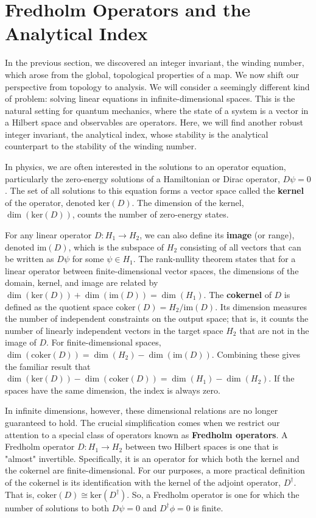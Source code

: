 \section{Fredholm Operators and the Analytical Index}
\label{sec:fredholm_index}

In the previous section, we discovered an integer invariant, the winding number, which arose from the global, topological properties of a map.
We now shift our perspective from topology to analysis.
We will consider a seemingly different kind of problem: solving linear equations in infinite-dimensional spaces.
This is the natural setting for quantum mechanics, where the state of a system is a vector in a Hilbert space and observables are operators.
Here, we will find another robust integer invariant, the analytical index, whose stability is the analytical counterpart to the stability of the winding number.

In physics, we are often interested in the solutions to an operator equation, particularly the zero-energy solutions of a Hamiltonian or Dirac operator, $D\psi = 0$.
The set of all solutions to this equation forms a vector space called the \textbf{kernel} of the operator, denoted $\text{ker}(D)$.
The dimension of the kernel, $\dim(\text{ker}(D))$, counts the number of zero-energy states.

For any linear operator $D: H_1 \to H_2$, we can also define its \textbf{image} (or range), denoted $\text{im}(D)$, which is the subspace of $H_2$ consisting of all vectors that can be written as $D\psi$ for some $\psi \in H_1$.
The rank-nullity theorem states that for a linear operator between finite-dimensional vector spaces, the dimensions of the domain, kernel, and image are related by $\dim(\text{ker}(D)) + \dim(\text{im}(D)) = \dim(H_1)$.
The \textbf{cokernel} of $D$ is defined as the quotient space $\text{coker}(D) = H_2 / \text{im}(D)$.
Its dimension measures the number of independent constraints on the output space; that is, it counts the number of linearly independent vectors in the target space $H_2$ that are not in the image of $D$.
For finite-dimensional spaces, $\dim(\text{coker}(D)) = \dim(H_2) - \dim(\text{im}(D))$.
Combining these gives the familiar result that $\dim(\text{ker}(D)) - \dim(\text{coker}(D)) = \dim(H_1) - \dim(H_2)$.
If the spaces have the same dimension, the index is always zero.

In infinite dimensions, however, these dimensional relations are no longer guaranteed to hold.
The crucial simplification comes when we restrict our attention to a special class of operators known as \textbf{Fredholm operators}.
A Fredholm operator $D: H_1 \to H_2$ between two Hilbert spaces is one that is "almost" invertible.
Specifically, it is an operator for which both the kernel and the cokernel are finite-dimensional.
For our purposes, a more practical definition of the cokernel is its identification with the kernel of the adjoint operator, $D^\dagger$.
That is, $\text{coker}(D) \cong \text{ker}(D^\dagger)$.
So, a Fredholm operator is one for which the number of solutions to both $D\psi=0$ and $D^\dagger\phi=0$ is finite.

